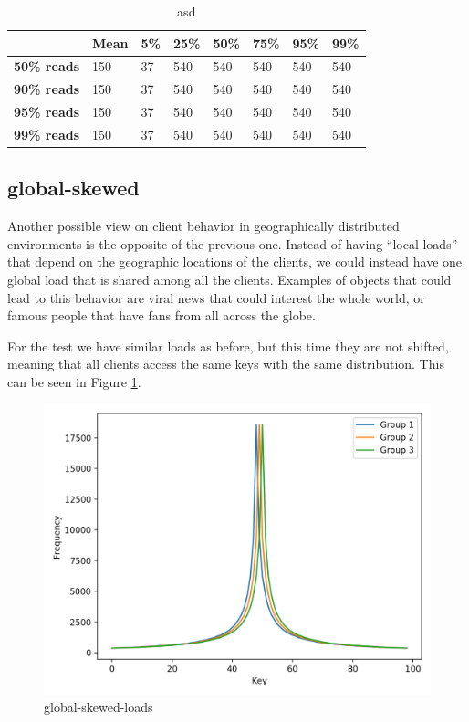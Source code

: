\begin{table}[!htb]
  \centering
  \begin{tabular}{l l l l l l l l}
    \hline
    & \textbf{Mean} & \textbf{5\%} & \textbf{25\%} & \textbf{50\%} & \textbf{75\%} & \textbf{95\%}& \textbf{99\%} \\
    \hline
    \textbf{50\% reads} & 150 & 37 & 540 & 540 & 540 & 540 & 540 \\
    \textbf{90\% reads} & 150 & 37 & 540 & 540 & 540 & 540 & 540 \\
    \textbf{95\% reads} & 150 & 37 & 540 & 540 & 540 & 540 & 540 \\
    \textbf{99\% reads} & 150 & 37 & 540 & 540 & 540 & 540 & 540 \\
    \hline
  \end{tabular}
  \caption{asd}\label{tab:local-latencies-table}
\end{table}


\subsection{global-skewed}\label{sec:global-skewed}
Another possible view on client behavior in geographically distributed environments is the opposite of the previous one. Instead of having ``local loads'' that depend on the geographic locations of the clients, we could instead have one global load that is shared among all the clients. Examples of objects that could lead to this behavior are viral news that could interest the whole world, or famous people that have fans from all across the globe.

For the test we have similar loads as before, but this time they are not shifted, meaning that all clients access the same keys with the same distribution. This can be seen in Figure \ref{fig:global-skewed-loads}.

\begin{figure}[!htb]
  \centering
  \includegraphics[width=\textwidth,height=\textheight,keepaspectratio]{img/clients_loads_global.png}
  \caption{ global-skewed-loads }
  \label{fig:global-skewed-loads}
\end{figure}

